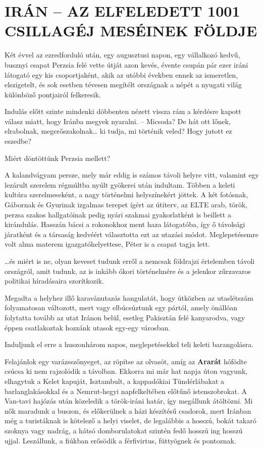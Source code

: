\clearpage
\chapter{IRÁN -- AZ ELFELEDETT 1001 CSILLAGÉJ MESÉINEK FÖLDJE}

Két évvel az ezredforduló után, egy augusztusi napon, egy vállalkozó
kedvű, busznyi csapat Perzsia felé vette útját azon kevés, évente csupán
pár ezer iráni látogató egy kis csoportjaként, akik az utóbbi években
ennek az ismeretlen, elszigetelt, és sok esetben tévesen megítélt
országnak a népét a nyugati világ különböző pontjairól felkeresik.

Indulás előtt szinte mindenki döbbenten nézett vissza rám a kérdésre
kapott válasz miatt, hogy Iránba megyek nyaralni. -- Micsoda?
De hát ott lőnek, elrabolnak, megerőszakolnak\dots{} ki tudja,
mi történik veled? Hogy jutott ez eszedbe?

Miért döntöttünk Perzsia mellett?

A kalandvágyam persze, mely már eddig is számos távoli helyre vitt,
valamint egy lezárult szerelem régmúltba nyúlt gyökerei után indultam.
Többen a keleti kultúra szerelmeseként, a nagy történelmi helyszínekért
jöttek. A két fotósnak, Gábornak és Gyurinak izgalmas terepet
ígért az útiterv, az ELTE arab, török, perzsa szakos hallgatóinak
pedig nyári szakmai gyakorlatként is beillett a kirándulás. Hasszán
bácsi a rokonokhoz ment haza látogatóba, így ő távolsági járatként és
a társaság kedvéért választotta ezt az utazási módot. Meglepetésemre
volt alma materem igazgatóhelyettese, Péter is a csapat tagja lett.

\dots és miért is ne, olyan keveset tudunk erről a nemcsak földrajzi
értelemben távoli országról, amit tudunk, az is inkább ókori történelmére
és a jelenkor zűrzavaros politikai híradásaira szorítkozik.

Megadta a helyhez illő karavánutazás hangulatát, hogy útközben
az utaslétszám folyamatosan változott, mert vagy elbúcsúztunk egy
pártól, amely önállóan folytatta tovább az utat Iránon belül, esetleg
Pakisztán felé kanyarodva, vagy éppen csatlakoztak hozzánk utasok
egy-egy városban.

Induljunk el erre a huszonhárom napos, meglepetésekkel teli keleti
barangolásra.

Felajánlok egy varázsszőnyeget, az röpítse az olvasót, amíg az
\textbf{Ararát} hófödte csúcsa ki nem rajzolódik a távolban.
Ekkorra mi már hat
napja úton vagyunk, elhagytuk a Kelet kapuját, Isztambult, a kappadókiai
Tündérlábakat a barlanglakásokkal és a Nemrut-hegyi napfelkeltében
előtűnő istenszobrokat. A Van-tavi hajózás után közeledik
a török-iráni határ, így megállunk átöltözni. Mi nők maradunk a buszon,
és előkerülnek a házi készítésű csadorok, mert Iránban még a
turistáknak is kötelező a helyi viselet, de legalábbis a hosszú, bokát
takaró szoknya vagy nadrág, a hátsó domborulatokat szintén fedő
hosszú ing hosszú ujjal. Leszállunk, a fiúkban erősödik a férfivirtus,
füttyögnek és pontoznak.

